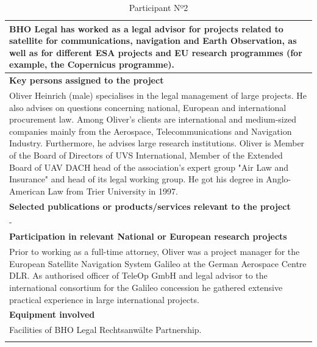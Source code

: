 \begin{longtable}[H]{|p{0.7cm}|p{4cm}|p{7cm}|p{1.3cm}|}
	\multicolumn{4}{|p{14.5cm}|}{BHO Legal has worked as a legal advisor for projects related to satellite for communications, navigation and Earth Observation, as well as for different ESA projects and EU research programmes (for example, the Copernicus programme).}  \\ \hline
	
	\multicolumn{4}{|p{13cm}|}{\textbf{Key persons assigned to the project}}   \\ \hline
	
	\multicolumn{4}{|p{14.5cm}|}{Oliver Heinrich (male) specialises in the legal management of large projects. He also advises on questions concerning national, European and international procurement law. Among Oliver's clients are international and medium-sized companies mainly from the Aerospace, Telecommunications and Navigation Industry. Furthermore, he advises large research institutions. Oliver is Member of the Board of Directors of UVS International, Member of the Extended Board of UAV DACH head of the association’s expert group "Air Law and Insurance" and head of its legal working group. He got his degree in Anglo-American Law from Trier University in 1997.}  \\ \hline
	
	\multicolumn{4}{|p{13cm}|}{\textbf{Selected publications or products/services relevant to the project}}  \\ \hline
	
	\multicolumn{4}{|p{14.5cm}|}{-}  \\ \hline
	
	\multicolumn{4}{|p{13cm}|}{\textbf{Participation in relevant National or European research projects}}  \\ \hline
	
	\multicolumn{4}{|p{14.5cm}|}{Prior to working as a full-time attorney, Oliver was a project manager for the European Satellite Navigation System Galileo at the German Aerospace Centre DLR. As authorised officer of TeleOp GmbH and legal advisor to the international consortium for the Galileo concession he gathered extensive practical experience in large international projects. }  \\ \hline
	
	\multicolumn{4}{|p{13cm}|}{\textbf{Equipment involved}}  \\ \hline
	
	\multicolumn{4}{|p{14.5cm}|}{Facilities of BHO Legal Rechtsanwälte Partnership.}  \\ \hline
	\caption{Participant Nº2}
\end{longtable}



